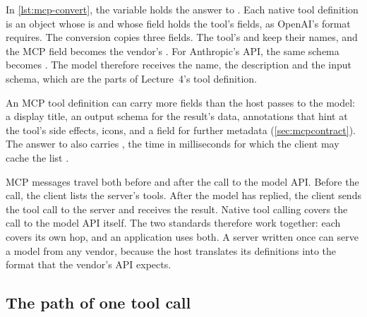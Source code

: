In \cref{lst:mcp-convert}, the variable  holds the answer to .
Each native tool definition is an object whose  is  and whose
 field holds the tool's fields, as OpenAI's format requires. The conversion copies
three fields. The tool's  and  keep their
names, and the MCP field  becomes the vendor's . For
Anthropic's API, the same schema becomes . The model therefore receives the
name, the description and the input schema, which are the parts of Lecture~4's tool definition.

An MCP tool definition can carry more fields than the host passes to the model: a display title, an
output schema for the result's data, annotations that hint at the tool's side effects, icons, and a
 field for further metadata (\cref{sec:mcpcontract}). The answer to  also carries , the time
in milliseconds for which the client may cache the list \citep{mcp-spec-2026}.

MCP messages travel both before and after the call to the model API. Before the call, the client
lists the server's tools. After the model has replied, the client sends the tool call to the server
and receives the result. Native tool calling covers the call to the model API itself. The two
standards therefore work together: each covers its own hop, and an application uses both. A server
written once can serve a model from any vendor, because the host translates its definitions into the
format that the vendor's API expects.

\subsection{The path of one tool call}
\label{sec:mcp-path}

